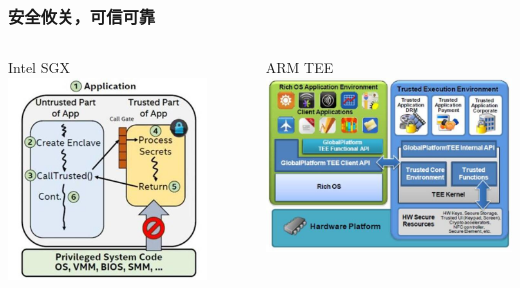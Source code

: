 \begin{frame}
\frametitle{安全攸关，可信可靠}
\begin{columns}
		\begin{column}{.455\textwidth}
		\begin{block}{Intel SGX}
			\includegraphics[width=0.84\textwidth]{fig23/sgx.jpeg}
		\end{block}
		\end{column}
		\begin{column}{.55\textwidth}
		\begin{block}{ARM TEE}
			\includegraphics[width=1.\textwidth]{fig23/tee.jpeg}
		\end{block}
		\end{column}
\end{columns}
\end{frame}



